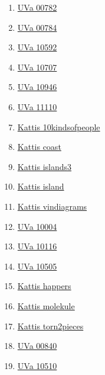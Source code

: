 \begin{enumerate}
\item \href{https://onlinejudge.org/index.php?option=com_onlinejudge&Itemid=8&page=show_problem&problem=723}{UVa 00782}
\item \href{https://onlinejudge.org/index.php?option=com_onlinejudge&Itemid=8&page=show_problem&problem=725}{UVa 00784}
\item \href{https://onlinejudge.org/index.php?option=com_onlinejudge&Itemid=8&page=show_problem&problem=1533}{UVa 10592}
\item \href{https://onlinejudge.org/index.php?option=com_onlinejudge&Itemid=8&page=show_problem&problem=1648}{UVa 10707}
\item \href{https://onlinejudge.org/index.php?option=com_onlinejudge&Itemid=8&page=show_problem&problem=1887}{UVa 10946}
\item \href{https://onlinejudge.org/index.php?option=com_onlinejudge&Itemid=8&page=show_problem&problem=2051}{UVa 11110}
\item \href{https://open.kattis.com/problems/10kindsofpeople}{Kattis 10kindsofpeople}
\item \href{https://open.kattis.com/problems/coast}{Kattis coast}
\item \href{https://open.kattis.com/problems/islands3}{Kattis islands3}
\item \href{https://open.kattis.com/problems/island}{Kattis island}
\item \href{https://open.kattis.com/problems/vindiagrams}{Kattis vindiagrams}
\item \href{https://onlinejudge.org/index.php?option=com_onlinejudge&Itemid=8&page=show_problem&problem=945}{UVa 10004}
\item \href{https://onlinejudge.org/index.php?option=com_onlinejudge&Itemid=8&page=show_problem&problem=1057}{UVa 10116}
\item \href{https://onlinejudge.org/index.php?option=com_onlinejudge&Itemid=8&page=show_problem&problem=1446}{UVa 10505}
\item \href{https://open.kattis.com/problems/happers}{Kattis happers}
\item \href{https://open.kattis.com/problems/molekule}{Kattis molekule}
\item \href{https://open.kattis.com/problems/torn2pieces}{Kattis torn2pieces}
\item \href{https://onlinejudge.org/index.php?option=com_onlinejudge&Itemid=8&page=show_problem&problem=781}{UVa 00840}
\item \href{https://onlinejudge.org/index.php?option=com_onlinejudge&Itemid=8&page=show_problem&problem=1451}{UVa 10510}

\end{enumerate}
